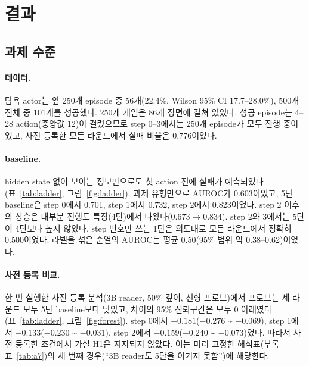\documentclass[11pt]{article}
\begin{document}
\section{결과}
\subsection{과제 수준}\label{sec:task}
\paragraph{데이터.} 탐욕 actor는 앞 250개 episode 중 56개(22.4\%, Wilson 95\% CI 17.7--28.0\%), 500개 전체 중 101개를 성공했다.
250개 게임은 86개 장면에 걸쳐 있었다. 성공 episode는 4--28 action(중앙값 12)이 걸렸으므로 step 0--3에서는 250개 episode가 모두 진행 중이었고,
사전 등록한 모든 라운드에서 실패 비율은 0.776이었다.

\paragraph{baseline.} hidden state 없이 보이는 정보만으로도 첫 action 전에 실패가 예측되었다(표~\ref{tab:ladder}, 그림~\ref{fig:ladder}).
과제 유형만으로 AUROC가 0.603이었고, 5단 baseline은 step 0에서 0.701, step 1에서 0.732, step 2에서 0.823이었다.
step 2 이후의 상승은 대부분 진행도 특징(4단)에서 나왔다($0.673 \rightarrow 0.834$). step 2와 3에서는 5단이 4단보다 높지 않았다.
step 번호만 쓰는 1단은 의도대로 모든 라운드에서 정확히 0.500이었다. 라벨을 섞은 순열의 AUROC는 평균 0.50(95\% 범위 약 0.38--0.62)이었다.

\paragraph{사전 등록 비교.} 한 번 실행한 사전 등록 분석(3B reader, 50\% 깊이, 선형 프로브)에서 프로브는 세 라운드 모두 5단 baseline보다 낮았고,
차이의 95\% 신뢰구간은 모두 0 아래였다(표~\ref{tab:ladder}, 그림~\ref{fig:forest}). step 0에서 $-0.181$($-0.276$ \textasciitilde{} $-0.069$), step 1에서 $-0.133$($-0.230$ \textasciitilde{} $-0.031$),
step 2에서 $-0.159$($-0.240$ \textasciitilde{} $-0.073$)였다. 따라서 사전 등록한 조건에서 가설 H1은 지지되지 않았다.
이는 미리 고정한 해석표(부록 표~\ref{tab:a7})의 세 번째 경우(``3B reader도 5단을 이기지 못함'')에 해당한다.
\end{document}
